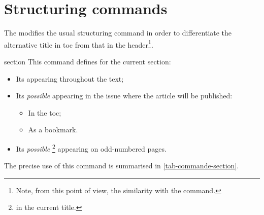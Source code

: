 \documentclass[english,nolocaltoc]{nwejmart}
\newtheorem[style=definition]{fact}
\newtheorem[title-plural=Criteria]{criterion}
\newtheorem[title=random experiment]{rexp}
\begin{document}
\section{Structuring commands}

The \nwejmauthorcl{} modifies the usual 
 structuring command in order to differentiate
the alternative title in \gls{toc} from that in the
header\footnote{Note, from this point of view, the similarity with the
  \protect{} command.}.

\begin{docCommand}[doc new=2017-10-23]{section}{}
  This command defines for the current section:
  \begin{itemize}
  \item Its  appearing throughout the text;
  \item Its \emph{possible}  appearing in the issue
    where the article will be published:
    \begin{itemize}
    \item In the \gls{toc};
    \item As a bookmark.
    \end{itemize}
  \item Its \emph{possible} \footnote{\Ie{} in the current title.} appearing
    on odd-numbered pages.
  \end{itemize}
  The precise use of this command is summarised in \vref{tab-commande-section}.
\end{docCommand}
\end{document}
